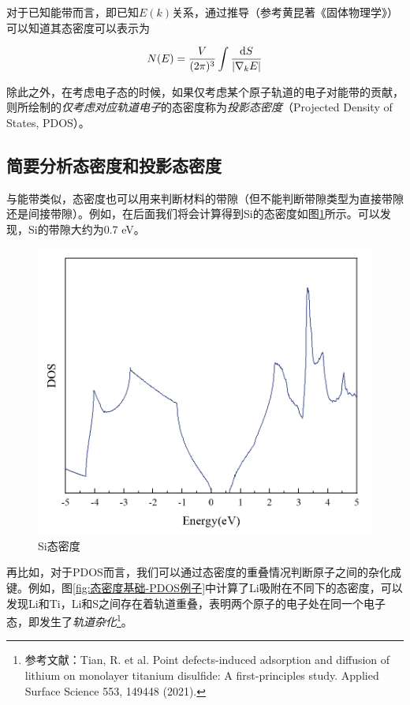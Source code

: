 对于已知能带而言，即已知$E(k)$关系，通过推导（参考黄昆著《固体物理学》）可以知道其态密度可以表示为

\begin{equation*}
    N(E)=\frac{V}{(2\pi)^3}\int\frac{\dd{S}}{\abs{\nabla_kE}}
\end{equation*}

除此之外，在考虑电子态的时候，如果仅考虑某个原子轨道的电子对能带的贡献，则所绘制的\emph{仅考虑对应轨道电子}的态密度称为\emph{投影态密度}（Projected Density of States, PDOS）。

\subsection{简要分析态密度和投影态密度}\label{subsec:态密度基础-简要分析态密度和投影态密度}

与能带类似，态密度也可以用来判断材料的带隙（但不能判断带隙类型为直接带隙还是间接带隙）。例如，在后面我们将会计算得到Si的态密度如图\ref{fig:态密度基础-Si态密度}所示。可以发现，Si的带隙大约为0.7 eV。

\begin{figure}
    \centering
    \includegraphics[width=1\linewidth]{VASP计算/态密度计算/态密度基础/fig/Si态密度.png}
    \caption{Si态密度}
    \label{fig:态密度基础-Si态密度}
\end{figure}

再比如，对于PDOS而言，我们可以通过态密度的重叠情况判断原子之间的杂化成键。例如，图\ref{fig:态密度基础-PDOS例子}中计算了Li吸附在不同下的态密度，可以发现Li和Ti，Li和S之间存在着轨道重叠，表明两个原子的电子处在同一个电子态，即发生了\emph{轨道杂化}\footnote{参考文献：Tian, R. et al. Point defects-induced adsorption and diffusion of lithium on monolayer titanium disulfide: A first-principles study. Applied Surface Science 553, 149448 (2021).}。

